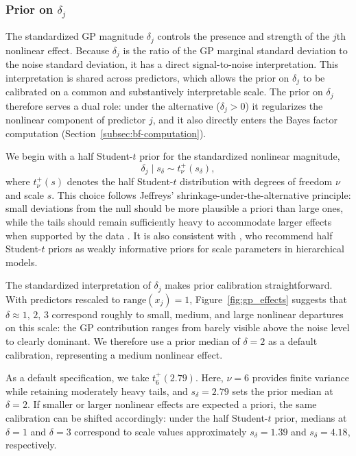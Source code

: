 \documentclass{article}
\begin{document}
\subsubsection{Prior on \texorpdfstring{$\delta_j$}{delta j}\label{subsubsec:prior-delta}}

The standardized GP magnitude $\delta_j$ controls the presence and
strength of the $j$th nonlinear effect. Because $\delta_j$ is the ratio
of the GP marginal standard deviation to the noise standard deviation,
it has a direct signal-to-noise interpretation. This interpretation is shared
across predictors, which allows the prior on $\delta_j$ to be calibrated
on a common and substantively interpretable scale. The prior on $\delta_j$ therefore
serves a dual role: under the alternative ($\delta_j>0$) it regularizes the
nonlinear component of predictor $j$, and it also directly enters the Bayes factor
computation (Section~\ref{subsec:bf-computation}).

We begin with a half Student-$t$ prior for the standardized nonlinear
magnitude,
\begin{equation}
  \delta_j \mid s_\delta \sim t^{+}_{\nu}(s_\delta),
  \label{eq:delta_prior_t}
\end{equation}
where $t^{+}_{\nu}(s)$ denotes the half Student-$t$ distribution with
degrees of freedom $\nu$ and scale $s$. This choice follows Jeffreys'
shrinkage-under-the-alternative principle: small deviations from the null
should be more plausible a priori than large ones, while the tails should
remain sufficiently heavy to accommodate larger effects when supported by
the data \parencite{jeffreys1961theory}. It is also consistent with
\textcite{gelman2006}, who recommend half Student-$t$ priors as weakly
informative priors for scale parameters in hierarchical models.

The standardized interpretation of $\delta_j$ makes prior calibration
straightforward. With predictors rescaled to $\mathrm{range}(x_j)=1$,
Figure~\ref{fig:gp_effects} suggests that $\delta \approx 1,\,2,\,3$
correspond roughly to small, medium, and large nonlinear departures on
this scale: the GP contribution ranges from barely visible above the
noise level to clearly dominant. We therefore use a prior median of
$\delta=2$ as a default calibration, representing a medium nonlinear
effect.

As a default specification, we take $t_6^{+}(2.79)$. Here, $\nu=6$
provides finite variance while retaining moderately heavy tails, and
$s_\delta=2.79$ sets the prior median at $\delta=2$. If smaller or
larger nonlinear effects are expected a priori, the same calibration can
be shifted accordingly: under the half Student-$t$ prior, medians at
$\delta=1$ and $\delta=3$ correspond to scale values approximately
$s_\delta=1.39$ and $s_\delta=4.18$, respectively.
\end{document}
